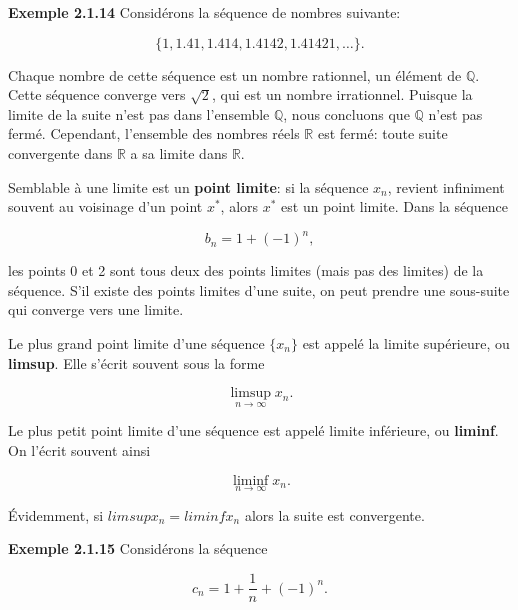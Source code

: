 \documentclass[10pt,twoside,a4paper]{book}
\begin{document}
\noindent
\vspace{4mm}
\textbf{Exemple 2.1.14} Considérons la séquence de nombres suivante:

\begin{equation*}
  \{1, 1.41, 1.414, 1.4142, 1.41421, \ldots\}.
\end{equation*}

\noindent
Chaque nombre de cette séquence est un nombre rationnel, un élément de $\mathbb{Q}$. Cette séquence converge vers $\sqrt{2}$, qui est un nombre irrationnel.
Puisque la limite de la suite n'est pas dans l'ensemble $\mathbb{Q}$, nous concluons que $\mathbb{Q}$ n'est pas fermé. Cependant, l'ensemble des nombres réels $\mathbb{R}$ est fermé: toute suite convergente dans $\mathbb{R}$ a sa limite dans $\mathbb{R}$.

\vspace{2mm}
Semblable à une limite est un \textbf{point limite}: si la séquence $x_n$, revient infiniment souvent au voisinage d'un point $x^*$, alors $x^*$ est un point limite. Dans la séquence

\begin{equation*}
  b_n = 1 + (-1)^n,
\end{equation*}

\noindent
les points 0 et 2 sont tous deux des points limites (mais pas des limites) de la séquence. S'il existe des points limites d'une suite, on peut prendre une sous-suite qui converge vers une limite.

Le plus grand point limite d'une séquence $\{x_n\}$ est appelé la limite supérieure, ou \textbf{limsup}. Elle s'écrit souvent sous la forme

\begin{equation*}
  \limsup_{n \longrightarrow \infty} x_n.
\end{equation*}

\noindent
Le plus petit point limite d'une séquence est appelé limite inférieure, ou \textbf{liminf}. On l'écrit souvent ainsi

\begin{equation*}
  \liminf_{n \longrightarrow \infty} x_n.
\end{equation*}

\noindent
Évidemment, si $lim sup x_n = lim inf x_n$ alors la suite est convergente.

\vspace{4mm}
\noindent
\textbf{Exemple 2.1.15} Considérons la séquence

\begin{equation*}
  c_n = 1+ \frac{1}{n} + (-1)^n.
\end{equation*}
\end{document}
